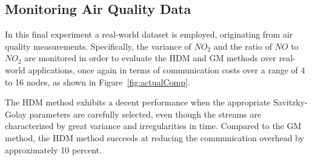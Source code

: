 \subsection{Monitoring Air Quality Data} \label{subsec:actualComp}

In this final experiment a real-world dataset is employed, originating from air quality measurements. Specifically, the variance of $NO_2$ and the ratio of $NO$ to $NO_2$ are monitored in order to evaluate the HDM and GM methods over real-world applications, once again in terms of communication costs over a range of 4 to 16 nodes, as shown in Figure~\ref{fig:actualComp}.

The HDM method exhibits a decent performance when the appropriate Savitzky-Golay parameters are carefully selected, even though the streams are characterized by great variance and irregularities in time. Compared to the GM method, the HDM method succeeds at reducing the communication overhead by approximately 10 percent.


